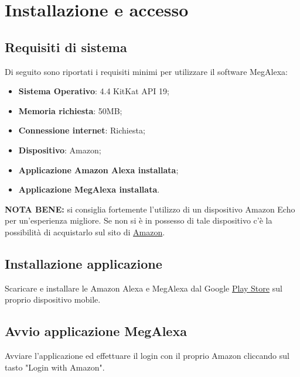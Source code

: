 \chapter{Installazione e accesso}


\section{Requisiti di sistema}
\label{Requisiti sistema}
Di seguito sono riportati i requisiti minimi per utilizzare il software MegAlexa:

\begin{itemize}
	\item \textbf{Sistema Operativo}:  4.4 KitKat API 19;
	\item \textbf{Memoria richiesta}: 50MB;
	\item \textbf{Connessione internet}: Richiesta;
	\item \textbf{Dispositivo}: Amazon;
	\item \textbf{Applicazione Amazon Alexa installata};
	\item \textbf{Applicazione MegAlexa installata}.
\end{itemize}

\textbf{NOTA BENE:} si consiglia fortemente l'utilizzo di un dispositivo Amazon Echo per un'esperienza migliore. Se non si è in possesso di tale dispositivo c'è la possibilità di acquistarlo sul sito di \href{https://www.amazon.it}{Amazon}.

\section{Installazione applicazione}
Scaricare e installare le  Amazon Alexa e MegAlexa dal Google \href{https://play.google.com/store/apps?hl=it}{Play Store} sul proprio dispositivo mobile.
\newpage
\section{Avvio applicazione MegAlexa}
\label{Installazione MegAlexa}
Avviare l'applicazione ed effettuare il login con il proprio  Amazon cliccando sul tasto "Login with Amazon".

